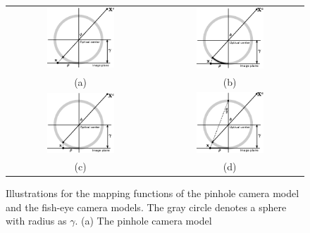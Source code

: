 \documentclass{report}
\begin{document}
\begin{figure}
\centering
\begin{tabular}{cc}
\includegraphics[width=0.48\textwidth]{images/pinholeMapping.eps} &
\includegraphics[width=0.48\textwidth]{images/equidistant.eps} \\
(a) & (b) \\
\includegraphics[width=0.48\textwidth]{images/orthographic.eps} &
\includegraphics[width=0.48\textwidth]{images/stereographic.eps} \\
(c) & (d)
\end{tabular}
\caption{Illustrations for the mapping functions of the pinhole camera model and the fish-eye camera models. The gray circle denotes a sphere with radius as $\gamma$. (a) The pinhole camera model}
\label{mappingFig}
\end{figure}
\end{document}

